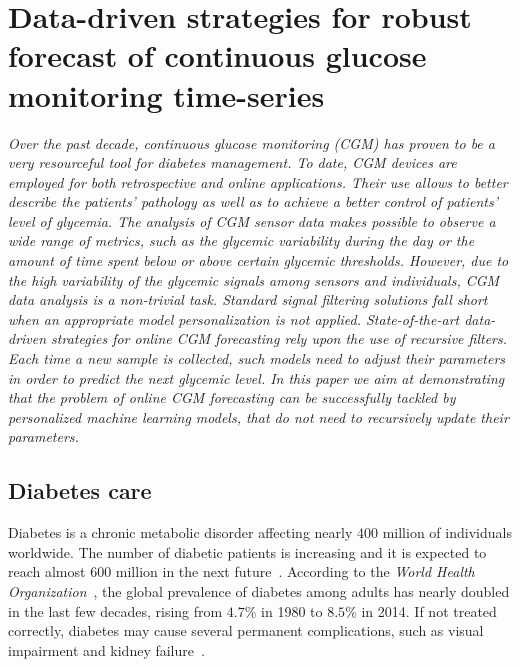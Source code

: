 
\chapter{Data-driven strategies for robust forecast of continuous glucose monitoring time-series} \label{chap:diabete}

\begin{displayquote}
\textit{Over the past decade, continuous glucose monitoring (CGM) has proven to be a very resourceful tool for diabetes management. To date, CGM devices are employed for both retrospective and online applications. Their use allows to better describe the patients' pathology as well as to achieve a better control  of  patients' level of glycemia. The analysis of CGM sensor data makes possible to observe a wide range of metrics, such as the glycemic variability during the day or the amount of time spent below or above certain glycemic thresholds. However, due to the high variability of the glycemic signals among sensors and individuals, CGM data analysis is a non-trivial task. Standard signal filtering solutions fall short when an appropriate model personalization is not applied. State-of-the-art data-driven strategies for online CGM forecasting rely upon the use of recursive filters. Each time a new sample is collected, such models need to adjust their parameters in order to predict the next glycemic level. In this paper we aim at demonstrating that the problem of online CGM forecasting can be successfully tackled by personalized machine learning models, that do not need to recursively update their parameters.}
\end{displayquote}

\section{Diabetes care}
Diabetes is a chronic metabolic disorder affecting nearly $400$ million of individuals worldwide. The number of diabetic patients is increasing and it is expected to reach almost $600$ million in the next future~\cite{guariguata2014global}.
According to the {\em World Health Organization}~\cite{world2016global}, the global prevalence of diabetes among adults has nearly doubled in the last few decades, rising from $4.7\%$ in 1980 to $8.5\%$ in 2014.
If not treated correctly, diabetes may cause several permanent complications, such as visual impairment and kidney failure~\cite{world2016global}. 

